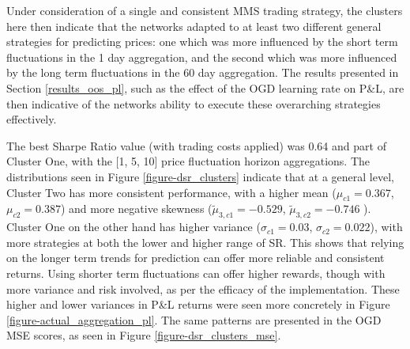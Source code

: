 \documentclass[a4paper,11pt,oneside]{article}
\theoremstyle{plain}
\theoremstyle{definition}
\begin{document}
	Under consideration of a single and consistent MMS trading strategy, the clusters here then indicate that the networks adapted to at least two different general strategies for predicting prices: one which was more influenced by the short term fluctuations in the 1 day aggregation, and the second which was more influenced by the long term fluctuations in the 60 day aggregation. The results presented in Section \ref{results_oos_pl}, such as the effect of the OGD learning rate on P\&L, are then indicative of the networks ability to execute these overarching strategies effectively. \newline
	
	The best Sharpe Ratio value (with trading costs applied) was 0.64 and part of Cluster One, with the [1, 5, 10] price fluctuation horizon aggregations. The distributions seen in Figure \ref{figure-dsr_clusters} indicate that at a general level, Cluster Two has more consistent performance, with a higher mean ($\mu_{c1} = 0.367$, $\mu_{c2} = 0.387$) and more negative skewness ($\tilde{\mu}_{3,c1} = -0.529$, $\tilde{\mu}_{3,c2} = -0.746$ ). Cluster One on the other hand has higher variance ($\sigma_{c1} = 0.03$, $\sigma_{c2} = 0.022$), with more strategies at both the lower and higher range of SR. This shows that relying on the longer term trends for prediction can offer more reliable and consistent returns. Using shorter term fluctuations can offer higher rewards, though with more variance and risk involved, as per the efficacy of the implementation. These higher and lower variances in P\&L returns were seen more concretely in Figure \ref{figure-actual_aggregation_pl}. The same patterns are presented in the OGD MSE scores, as seen in Figure \ref{figure-dsr_clusters_mse}.\newline
\end{document}
